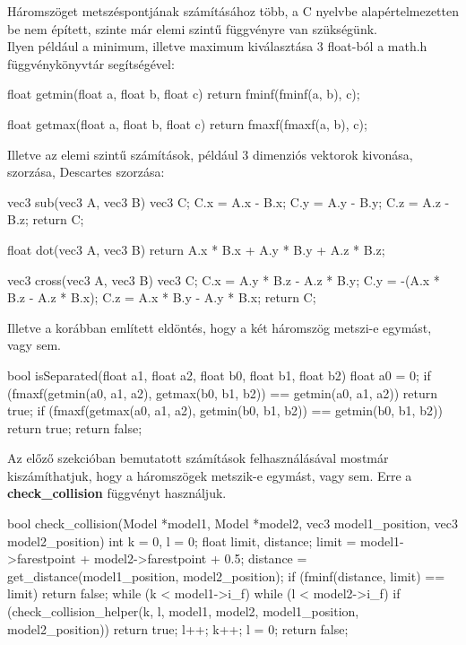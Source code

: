 Háromszöget metszéspontjának számításához több, a C nyelvbe alapértelmezetten be nem épített, szinte már elemi szintű függvényre van szükségünk. \\
Ilyen például a minimum, illetve maximum kiválasztása 3 float-ból a math.h függvénykönyvtár segítségével:

\begin{cpp}
float getmin(float a, float b, float c)
{
    return fminf(fminf(a, b), c);
}

float getmax(float a, float b, float c)
{
    return fmaxf(fmaxf(a, b), c);
}
\end{cpp}
Illetve az elemi szintű számítások, például 3 dimenziós vektorok kivonása, szorzása, Descartes szorzása:

\begin{cpp}
vec3 sub(vec3 A, vec3 B)
{
    vec3 C;
    C.x = A.x - B.x;
    C.y = A.y - B.y;
    C.z = A.z - B.z;
    return C;
}
	
float dot(vec3 A, vec3 B)
{
    return A.x * B.x + A.y * B.y + A.z * B.z;
}
\end{cpp}
\newpage
\begin{cpp}
vec3 cross(vec3 A, vec3 B)
{
    vec3 C;
    C.x = A.y * B.z - A.z * B.y;
    C.y = -(A.x * B.z - A.z * B.x);
    C.z = A.x * B.y - A.y * B.x;
    return C;
}
\end{cpp}
Illetve a korábban említett eldöntés, hogy a két háromszög metszi-e egymást, vagy sem.

\begin{cpp}
bool isSeparated(float a1, float a2, float b0, float b1, float b2)
{
    float a0 = 0;
    if (fmaxf(getmin(a0, a1, a2), getmax(b0, b1, b2)) 
    == getmin(a0, a1, a2))
    {
        return true;
    }
    if (fmaxf(getmax(a0, a1, a2), getmin(b0, b1, b2)) 
    == getmin(b0, b1, b2))
    {
        return true;
    }
    return false;
}
\end{cpp}
\newpage
{}

Az előző szekcióban bemutatott számítások felhasználásával mostmár kiszámíthatjuk, hogy a háromszögek metszik-e egymást, vagy sem. Erre a \textbf{check\_collision} függvényt használjuk.

\begin{cpp}
bool check_collision(Model *model1, Model *model2, vec3 model1_position,
vec3 model2_position)
{
    int k = 0, l = 0;
    float limit, distance;
    limit = model1->farestpoint + model2->farestpoint + 0.5;
    distance = get_distance(model1_position, model2_position);
    if (fminf(distance, limit) == limit)
    {
        return false;
    }
    while (k < model1->i_f)
    {
        while (l < model2->i_f)
        {
            if (check_collision_helper(k, l, model1, model2, 
            model1_position, model2_position))
            {
                return true;
            }
            l++;
        }
        k++;
        l = 0;
    }
    return false;
}
\end{cpp}

